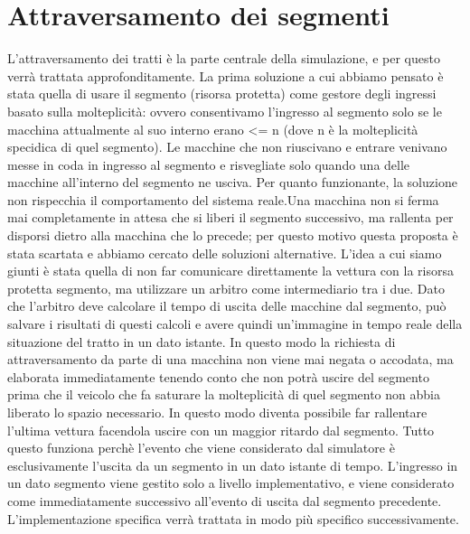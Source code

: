 
\section{Attraversamento dei segmenti}

L’attraversamento dei tratti è la parte centrale della simulazione, e per questo verrà trattata approfonditamente.
La prima soluzione a cui abbiamo pensato è stata quella di usare il segmento (risorsa protetta) come gestore degli ingressi basato sulla molteplicità: ovvero consentivamo l’ingresso al segmento solo se le macchina attualmente al suo interno erano <= n (dove n è la molteplicità specidica di quel segmento). Le macchine che non riuscivano e entrare venivano messe in coda in ingresso al segmento e risvegliate solo quando una delle macchine all’interno del segmento ne usciva.
Per quanto funzionante, la soluzione non rispecchia il comportamento del sistema reale.Una macchina non si ferma mai completamente in attesa che si liberi il segmento successivo, ma rallenta per disporsi dietro alla macchina che lo precede; per questo motivo questa proposta è stata scartata e abbiamo cercato delle soluzioni alternative.
L’idea a cui siamo giunti è stata quella di non far comunicare direttamente la vettura con la risorsa protetta segmento, ma utilizzare un arbitro come intermediario tra i due. Dato che l’arbitro deve calcolare il tempo di uscita delle macchine dal segmento, può salvare i risultati di questi calcoli e avere quindi un’immagine in tempo reale della situazione del tratto in un dato istante. In questo modo la richiesta di attraversamento da parte di una macchina non viene mai negata o accodata, ma elaborata immediatamente tenendo conto che non potrà uscire del segmento prima che il veicolo che fa saturare la molteplicità di quel segmento non abbia liberato lo spazio necessario. In questo modo diventa possibile far rallentare l’ultima vettura facendola uscire con un maggior ritardo dal segmento.
Tutto questo funziona perchè l’evento che viene considerato dal simulatore è esclusivamente l’uscita da un segmento in un dato istante di tempo. L’ingresso in un dato segmento viene gestito solo a livello implementativo, e viene considerato come immediatamente successivo all’evento di uscita dal segmento precedente.
L’implementazione specifica verrà trattata in modo più specifico successivamente.
